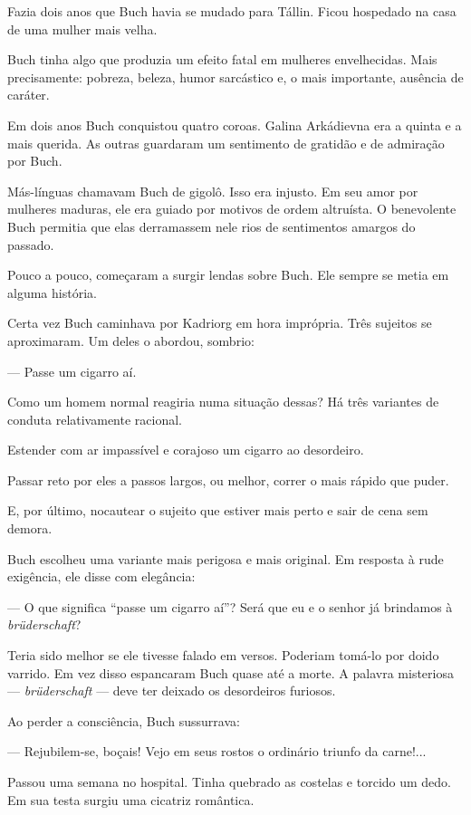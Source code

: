 Fazia dois anos que Buch havia se mudado para Tállin. Ficou hospedado na
casa de uma mulher mais velha.

Buch tinha algo que produzia um efeito fatal em mulheres envelhecidas.
Mais precisamente: pobreza, beleza, humor sarcástico e, o mais
importante, ausência de caráter.

Em dois anos Buch conquistou quatro coroas. Galina Arkádievna era a
quinta e a mais querida. As outras guardaram um sentimento de gratidão e
de admiração por Buch.

Más-línguas chamavam Buch de gigolô. Isso era injusto. Em seu amor por
mulheres maduras, ele era guiado por motivos de ordem altruísta. O
benevolente Buch permitia que elas derramassem nele rios de sentimentos
amargos do passado.

Pouco a pouco, começaram a surgir lendas sobre Buch. Ele sempre se metia
em alguma história.

Certa vez Buch caminhava por Kadriorg em hora imprópria. Três sujeitos
se aproximaram. Um deles o abordou, sombrio:

--- Passe um cigarro aí.

Como um homem normal reagiria numa situação dessas? Há três variantes de
conduta relativamente racional.

Estender com ar impassível e corajoso um cigarro ao desordeiro.

Passar reto por eles a passos largos, ou melhor, correr o mais rápido
que puder.

E, por último, nocautear o sujeito que estiver mais perto e sair de cena
sem demora.

Buch escolheu uma variante mais perigosa e mais original. Em resposta à
rude exigência, ele disse com elegância:

--- O que significa ``passe um cigarro aí''? Será que eu e o senhor já
brindamos à \emph{brüderschaft}?

Teria sido melhor se ele tivesse falado em versos. Poderiam tomá-lo por
doido varrido. Em vez disso espancaram Buch quase até a morte. A palavra
misteriosa --- \emph{brüderschaft} --- deve ter deixado os desordeiros
furiosos.

Ao perder a consciência, Buch sussurrava:

--- Rejubilem-se, boçais! Vejo em seus rostos o ordinário triunfo da
carne!...

Passou uma semana no hospital. Tinha quebrado as costelas e torcido um
dedo. Em sua testa surgiu uma cicatriz romântica.


